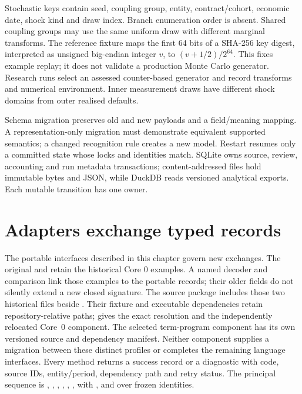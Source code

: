 Stochastic keys contain seed, coupling group, entity, contract/cohort,
economic date, shock kind and draw index. Branch enumeration order is absent.
Shared coupling groups may use the same uniform draw with different marginal
transforms. The reference fixture maps the first 64 bits of a SHA-256 key
digest, interpreted as unsigned big-endian integer $v$, to
$(v+1/2)/2^{64}$. This fixes example replay; it does not validate a production
Monte Carlo generator. Research runs select an assessed counter-based
generator and record transforms and numerical environment. Inner measurement
draws have different shock domains from outer realised defaults.

Schema migration preserves old and new payloads and a field/meaning mapping.
A representation-only migration must demonstrate equivalent supported
semantics; a changed recognition rule creates a new model. Restart resumes
only a committed state whose locks and identities match. SQLite owns source,
review, accounting and run metadata transactions; content-addressed files hold immutable
bytes and JSON, while DuckDB reads versioned analytical exports. Each mutable
transition has one owner.

\section{Adapters exchange typed records}

The portable interfaces described in this chapter govern new exchanges.
The original  and
 retain the historical Core 0 examples.
A named decoder and comparison link those examples to the portable records;
their older fields do not silently extend a new closed signature.
The source package includes those two historical files beside
. Their fixture and executable dependencies retain
repository-relative paths;  gives the exact
resolution and the independently relocated Core~0 component. The selected
term-program component has its own versioned source and dependency manifest.
Neither component supplies a migration between these distinct profiles or
completes the remaining language interfaces. Every method returns a success record or a
diagnostic with code, source IDs, entity/period, dependency path and retry
status. The principal sequence is , ,
, , , , with
,  and  over frozen identities.


